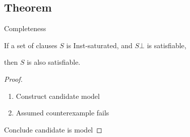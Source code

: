\documentclass[%
handout,
]{beamer}
\begin{document}
\subsection{Theorem}
\begin{frame}{Completeness}

    \vspace{1.4em}

    \begin{theorem}
    If a set of clauses $S$ is Inst-saturated,
    and $S\bot$ is satisfiable,

    then $S$ is also satisfiable.
    \end{theorem}
    \vspace{1.4em}

    \begin{proof}
        \begin{enumerate}
            \item Construct candidate model
            \item Assumed counterexample fails
        \end{enumerate}
        Conclude candidate is model
        \end{proof}
\end{frame}
\end{document}
